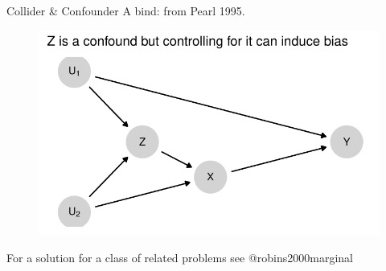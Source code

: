 \documentclass[
  11pt,
  ignorenonframetext,
]{beamer}
\begin{document}
\begin{frame}{Collider \& Confounder}
\protect\hypertarget{collider-confounder}{}
A bind: from Pearl 1995.

\begin{figure}

{\centering \includegraphics{2.2_estimands_files/figure-beamer/unnamed-chunk-16-1.pdf}

}

\end{figure}

For a solution for a class of related problems see @robins2000marginal
\end{frame}
\end{document}
